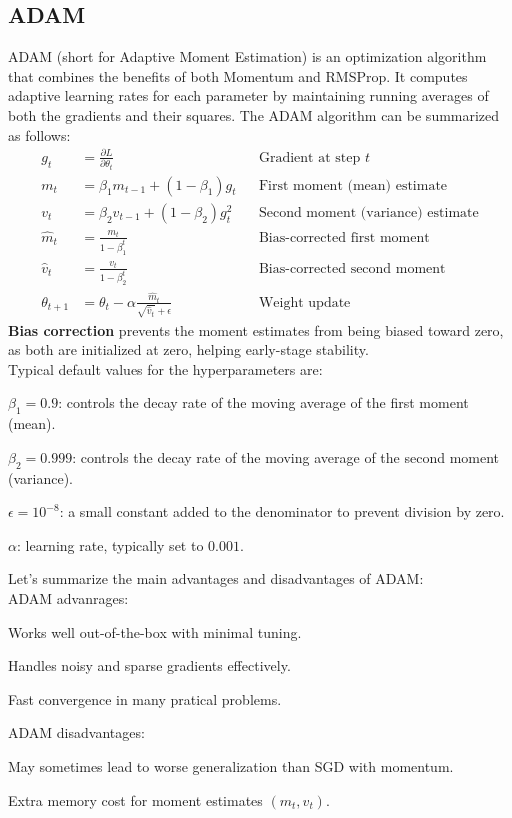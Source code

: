 \subsection{ADAM}
ADAM (short for Adaptive Moment Estimation) is an optimization algorithm that combines the benefits of both Momentum and RMSProp. It computes adaptive learning rates for each parameter by maintaining running averages of both the gradients and their squares.
The ADAM algorithm can be summarized as follows:
\begin{align}
    g_t &= \frac{\partial L}{\partial \theta_t} && \text{Gradient at step } t \\
    m_t &= \beta_1 m_{t-1} + (1 - \beta_1) g_t && \text{First moment (mean) estimate} \\
    v_t &= \beta_2 v_{t-1} + (1 - \beta_2) g_t^2 && \text{Second moment (variance) estimate} \\
    \hat{m}_t &= \frac{m_t}{1 - \beta_1^t} && \text{Bias-corrected first moment} \\
    \hat{v}_t &= \frac{v_t}{1 - \beta_2^t} && \text{Bias-corrected second moment} \\
    \theta_{t+1} &= \theta_t - \alpha \frac{\hat{m}_t}{\sqrt{\hat{v}_t} + \epsilon} && \text{Weight update}
\end{align}
\textbf{Bias correction} prevents the moment estimates from being biased toward zero, as both are initialized at zero, helping early-stage stability.\\
Typical default values for the hyperparameters are:
\begin{compactitemize}
    \item $\beta_1 = 0.9$: controls the decay rate of the moving average of the first moment (mean).
    \item $\beta_2 = 0.999$: controls the decay rate of the moving average of the second moment (variance).
    \item $\epsilon = 10^{-8}$: a small constant added to the denominator to prevent division by zero.
    \item $\alpha$: learning rate, typically set to $0.001$.
\end{compactitemize}

Let's summarize the main advantages and disadvantages of ADAM:\\
ADAM advanrages:
\begin{compactitemize}
    \item Works well out-of-the-box with minimal tuning.
    \item Handles noisy and sparse gradients effectively.
    \item Fast convergence in many pratical problems.
\end{compactitemize}
ADAM disadvantages:
\begin{compactitemize}
    \item May sometimes lead to worse generalization than SGD with momentum.
    \item Extra memory cost for moment estimates $(m_t,v_t)$.
\end{compactitemize}

    

